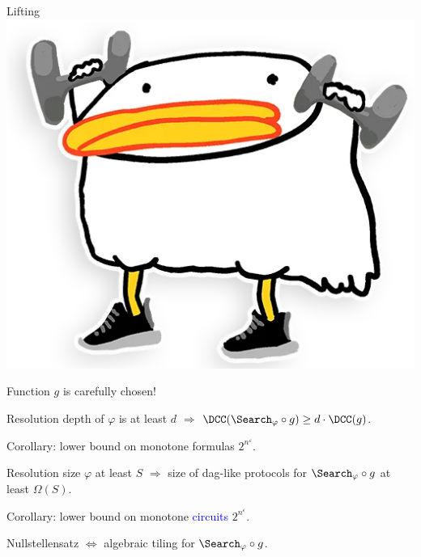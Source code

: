 \begin{frame}{Lifting \includegraphics[scale = 0.04]{pics/utia-lift.png}}

    Function $g$ is carefully chosen!
    \begin{theorem}
        Resolution depth of $\varphi$ is at least $d$ $\Rightarrow$
        $\DCC(\Search_{\varphi} \circ g) \ge d \cdot \DCC(g)$.
    \end{theorem}

    Corollary: lower bound on monotone formulas $2^{n^{\varepsilon}}$.
    \pause

    \begin{theorem}
        Resolution size $\varphi$ at least $S$ $\Rightarrow$
        size of \alert{dag-like} protocols for $\Search_{\varphi}
        \circ g$ at least $\Omega(S)$.
    \end{theorem}

    Corollary: lower bound on monotone \textcolor{blue}{circuits} $2^{n^{\varepsilon}}$.
    \pause

    \begin{theorem}
        Nullstellensatz $\Leftrightarrow$ \alert{algebraic tiling} for $\Search_{\varphi} \circ g$.
    \end{theorem}

\end{frame}

